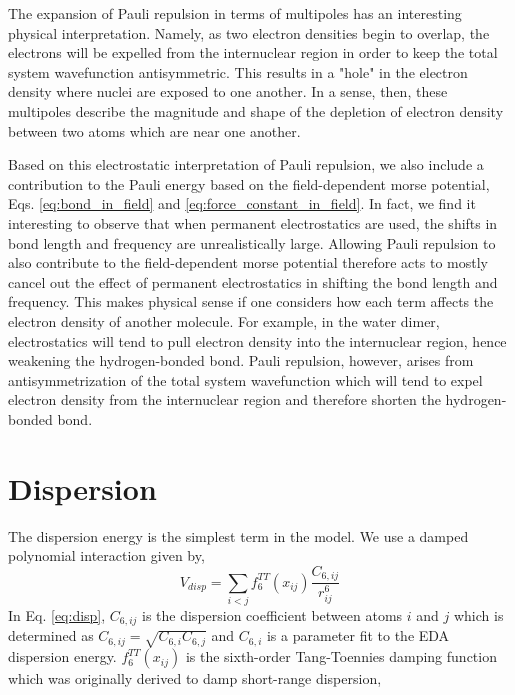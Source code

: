 \documentclass[journal=jacsat,manuscript=article]{achemso}
\begin{document}
The expansion of Pauli repulsion in terms of multipoles has an interesting physical interpretation. Namely, as two electron densities begin to overlap, the electrons will be expelled from the internuclear region in order to keep the total system wavefunction antisymmetric. This results in a "hole" in the electron density where nuclei are exposed to one another. In a sense, then, these multipoles describe the magnitude and shape of the depletion of electron density between two atoms which are near one another.

Based on this electrostatic interpretation of Pauli repulsion, we also include a contribution to the Pauli energy based on the field-dependent morse potential, Eqs. \ref{eq:bond_in_field} and \ref{eq:force_constant_in_field}. In fact, we find it interesting to observe that when permanent electrostatics are used, the shifts in bond length and frequency are unrealistically large. Allowing Pauli repulsion to also contribute to the field-dependent morse potential therefore acts to mostly cancel out the effect of permanent electrostatics in shifting the bond length and frequency. This makes physical sense if one considers how each term affects the electron density of another molecule. For example, in the water dimer, electrostatics will tend to pull electron density into the internuclear region, hence weakening the hydrogen-bonded  bond. Pauli repulsion, however, arises from antisymmetrization of the total system wavefunction which will tend to expel electron density from the internuclear region and therefore shorten the hydrogen-bonded  bond.

\section*{Dispersion}

The dispersion energy is the simplest term in the model. We use a damped polynomial interaction given by,
\begin{equation}
  V_{disp}=\sum_{i<j}f_6^{TT}(x_{ij})\frac{C_{6,ij}}{r_{ij}^6}
  \label{eq:disp}
\end{equation}
\noindent
In Eq. \ref{eq:disp}, $C_{6,ij}$ is the dispersion coefficient between atoms $i$ and $j$ which is determined as $C_{6,ij}=\sqrt{C_{6,i}C_{6,j}}$ and $C_{6,i}$ is a parameter fit to the EDA dispersion energy. $f_6^{TT}(x_{ij})$ is the sixth-order Tang-Toennies damping function\cite{tang1984improved} which was originally derived to damp short-range dispersion,
\end{document}
